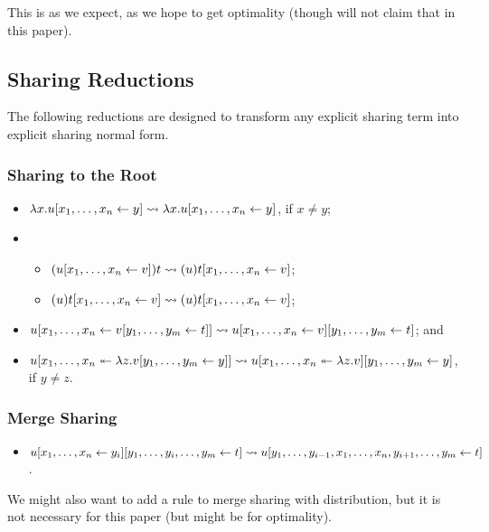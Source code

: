 \documentclass[11pt,a4paper]{article}
\theoremstyle{definition}
\theoremstyle{plain}
\theoremstyle{remark}
\begin{document}
This is as we expect, as we hope to get optimality (though will not claim that in this paper).

\subsection{Sharing Reductions}

The following reductions are designed to transform any explicit sharing term into explicit sharing normal form.

\subsubsection{Sharing to the Root}

\begin{itemize}
 \item $\lambda x.{{{u}[{{x_1},\dots,{x_n}}\leftarrow{y}]}}\rightsquigarrow{{{\lambda x.u}[{{x_1},\dots,{x_n}}\leftarrow{y}]}}$, if $x\neq y$;
 \item \begin{itemize}
        \item $({{{u}[{{x_1},\dots,{x_n}}\leftarrow{v}]}})t\rightsquigarrow{{{(u)t}[{{x_1},\dots,{x_n}}\leftarrow{v}]}}$;
        \item $(u){{{t}[{{x_1},\dots,{x_n}}\leftarrow{v}]}}\rightsquigarrow{{{(u)t}[{{x_1},\dots,{x_n}}\leftarrow{v}]}}$;
       \end{itemize}
 \item ${{{u}[{{x_1},\dots,{x_n}}\leftarrow{{{{v}[{{y_1},\dots,{y_m}}\leftarrow{t}]}}}]}}\rightsquigarrow{{{{{{u}[{{x_1},\dots,{x_n}}\leftarrow{v}]}}}[{{y_1},\dots,{y_m}}\leftarrow{t}]}}$; and
 \item ${{u}[{x_1},\dots,{x_n}\twoheadleftarrow{\lambda{z}.{{{{v}[{{y_1},\dots,{y_m}}\leftarrow{y}]}}}}]}\rightsquigarrow{{{{{u}[{x_1},\dots,{x_n}\twoheadleftarrow{\lambda{z}.{v}}]}}[{{y_1},\dots,{y_m}}\leftarrow{y}]}}$, if $y\neq z$. 
\end{itemize}

\subsubsection{Merge Sharing}

\begin{itemize}
 \item ${{{{{u}[{{x_1},\dots,{x_n}}\leftarrow{y_i}]}}}[{y_1,\dots,y_i,\dots,y_m}\leftarrow{t}]}\rightsquigarrow
	{{u}[{y_1,\dots,y_{i-1},x_1,\dots,x_n,y_{i+1},\dots,y_m}\leftarrow{t}]}$.
\end{itemize}

We might also want to add a rule to merge sharing with distribution, but it is not necessary for this paper (but might be for optimality).
\end{document}
